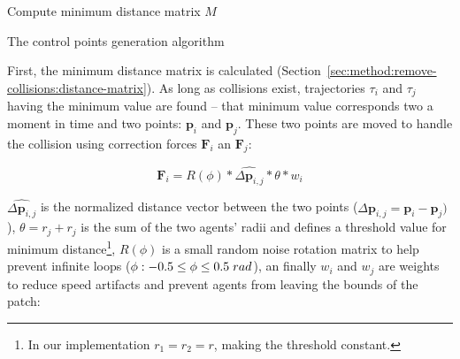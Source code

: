

\begin{algorithm}[t]
Compute minimum distance matrix $M$\;
\caption{The control points generation algorithm}
\label{algo:control-points}
\end{algorithm}





First, the minimum distance matrix is calculated (Section~\ref{sec:method:remove-collisions:distance-matrix}).
As long as collisions exist, trajectories $\tau_i$ and $\tau_j$ having the minimum value are found -- that minimum value corresponds two a moment in time and two points: $\mathbf{p}_i$ and $\mathbf{p}_j$.
These two points are moved to handle the collision using correction forces $\mathbf{F}_i$ an $\mathbf{F}_j$:

\begin{equation}
	 \mathbf{F}_{i}= R(\phi) * \hat{\Delta{\mathbf{p}_{i, j}}}* \theta * w_i
\end{equation}

$\hat{\Delta{\mathbf{p}_{i, j}}}$ is the normalized distance vector between the two points ($\Delta{\mathbf{p}_{i, j}} = \mathbf{p}_i - \mathbf{p}_j)$),
$\theta = r_j + r_j$ is the sum of the two agents' radii and defines a threshold value for minimum distance\footnote{In our implementation $r_1 = r_2 = r$, making the threshold constant.},
$R(\phi)$ is a small random noise rotation matrix to help prevent infinite loops ($\phi: -0.5 \le \phi \le 0.5 \hspace{0.1cm} rad$),
an finally $w_i$ and $w_j$ are weights to reduce speed artifacts and prevent agents from leaving the bounds of the patch:

